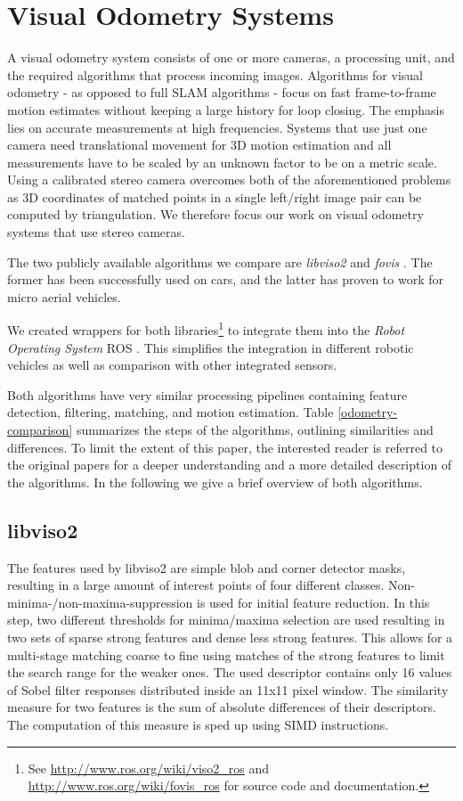 \documentclass[conference]{IEEEtran}
\begin{document}
\section{Visual Odometry Systems
  \label{visual-odometry-systems}
}
A visual odometry system consists of one or more cameras, a processing unit, and the required algorithms that process incoming images.
Algorithms for visual odometry - as opposed to full SLAM algorithms - focus on fast frame-to-frame motion estimates without keeping a large history for loop closing. The emphasis lies on accurate measurements at high frequencies. Systems that use just one camera need translational movement for 3D motion estimation and all measurements have to be scaled by an unknown factor to be on a metric scale. Using a calibrated stereo camera overcomes both of the aforementioned problems as 3D coordinates of matched points in a single left/right image pair can be computed by triangulation. We therefore focus our work on visual odometry systems that use stereo cameras.

The two publicly available algorithms we compare are \emph{libviso2} \cite{Geiger2011} and \emph{fovis} \cite{Huang2011}. The former has been successfully used on cars, and the latter has proven to work for micro aerial vehicles.

We created wrappers for both libraries\footnote{See \url{http://www.ros.org/wiki/viso2_ros} and \url{http://www.ros.org/wiki/fovis_ros} for source code and documentation.} to integrate them into the \textit{Robot Operating System} ROS \cite{Quigley2009}. This simplifies the integration in different robotic vehicles as well as comparison with other integrated sensors.


Both algorithms have very similar processing pipelines containing feature detection, filtering, matching, and motion estimation. Table \ref{odometry-comparison} summarizes the steps of the algorithms, outlining similarities and differences. To limit the extent of this paper, the interested reader is referred to the original papers for a deeper understanding and a more detailed description of the algorithms. In the following we give a brief overview of both algorithms.

\subsection{libviso2
  \label{libviso2}
}

The features used by libviso2 are simple blob and corner detector masks, resulting in a large amount of interest points of four different classes. Non-minima-/non-maxima-suppression is used for initial feature reduction. In this step, two different thresholds for minima/maxima selection are used resulting in two sets of sparse strong features and dense less strong features. This allows for a multi-stage matching coarse to fine using matches of the strong features to limit the search range for the weaker ones. The used descriptor contains only 16 values of Sobel filter responses distributed inside an 11x11 pixel window. The similarity measure for two features is the sum of absolute differences of their descriptors. The computation of this measure is sped up using SIMD instructions.
\end{document}
